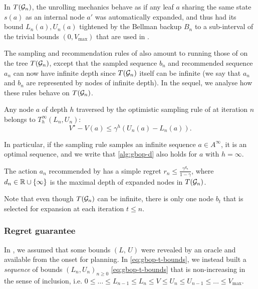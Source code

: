 In $T(\mathcal{G}_n)$, the unrolling mechanics behave as if any leaf $a$ sharing the same state $s(a)$ as an internal node $a'$ was automatically expanded, and thus had its bound $L_n(a), U_n(a)$ tightened by the Bellman backup $B_n$ to a sub-interval of the trivial bounds $(0, V_{\max})$ that are used in \OPD.

The sampling and recommendation rules of \GBOPD also amount to running those of \OPD on the tree $T(\mathcal{G}_n)$, except that the sampled sequence $b_n$ and recommended sequence $a_n$ can now have infinite depth since $T(\mathcal{G}_n)$ itself can be infinite (we say that $a_n$ and $b_n$ are represented by nodes of infinite depth). In the sequel, we analyse how these rules behave on $T(\mathcal{G}_n)$.

\begin{lemma}[Expansion]
	\begin{leftbar}[lemmabar]
	\label{lem:expansion-bound}
	Any node $a$ of depth $h$ traversed by the optimistic sampling rule of \GBOPD at iteration $n$ belongs to $T_h^\infty(L_n, U_n)$: 
	\begin{equation}
	\label{eq:expansion-regret}
	V^\star-V(a) \leq \gamma^h(U_n(a)-L_n(a)).
	\end{equation}
	
	In particular, if the sampling rule samples an infinite sequence $a\in A^\infty$, it is an optimal sequence, and we write that \eqref{alg:gbop-d} also holds for $a$ with $h=\infty$.
	\end{leftbar}
\end{lemma}


\begin{lemma}[Recommendation]
	\begin{leftbar}[lemmabar]
	\label{lem:recommendation-bound}
	The action $a_n$ recommended by \GBOPD has a simple regret $r_n \leq \frac{\gamma^{d_n}}{1-\gamma}$, where $d_n\in\mathbb{R}\cup\{\infty\}$ is the maximal depth of expanded nodes in $T(\mathcal{G}_n)$.
	\end{leftbar}
\end{lemma}
Note that even though $T(\mathcal{G}_n)$ can be infinite, there is only one node $b_t$ that is selected for expansion at each iteration $t\leq n$.

\subsubsection{Regret guarantee}

In , we assumed that some bounds $(L,\,U)$ were revealed by an oracle and available from the onset for planning. In \eqref{eq:gbop-t-bounds}, we instead built a \emph{sequence} of bounds $(L_n,U_n)_{n\geq 0}$ \eqref{eq:gbop-t-bounds} that is non-increasing in the sense of inclusion, i.e. $0\leq \dots\leq L_{n-1}\leq L_n\leq V\leq U_n\leq U_{n-1}\leq \dots\leq V_{\max}$.

